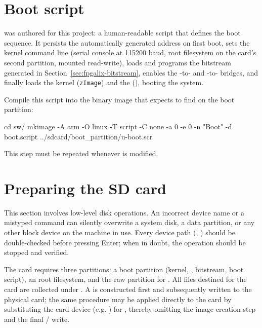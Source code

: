 \section{Boot script}
\label{sec:fpgalix-boot-script}

 was authored for this project: a human-readable  script that defines the boot sequence. It persists the automatically generated  address on first boot, sets the kernel command line (serial console at 115200 baud, root filesystem on the  card's second partition, mounted read-write), loads and programs the  bitstream generated in Section~\ref{sec:fpgalix-bitstream}, enables the -to- and -to- bridges, and finally loads the  kernel (\texttt{zImage}) and the  (), booting the system.

Compile this script into the binary image that  expects to find on the boot partition:

\begin{shellcodehost}
cd sw/
mkimage -A arm -O linux -T script -C none -a 0 -e 0 -n "Boot" -d boot.script ../sdcard/boot_partition/u-boot.scr
\end{shellcodehost}

This step must be repeated whenever  is modified.

\section{Preparing the SD card}

\begin{warningbox}
    This section involves low-level disk operations. An incorrect device name or a mistyped command can silently overwrite a system disk, a data partition, or any other block device on the machine in use. Every device path (, ) should be double-checked before pressing Enter; when in doubt, the operation should be stopped and verified.
\end{warningbox}

The  card requires three partitions: a  boot partition (kernel, , bitstream, boot script), an  root filesystem, and the raw  partition for . All files destined for the card are collected under . A  is constructed first and subsequently written to the physical  card; the same procedure may be applied directly to the  card by substituting the  card device (e.g. ) for , thereby omitting the image creation step and the final / write.


